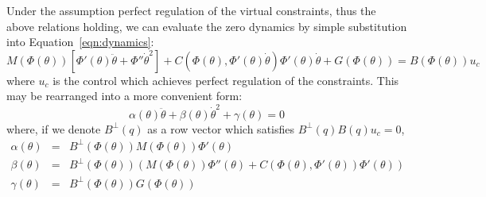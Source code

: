 Under the assumption perfect regulation of the virtual constraints, thus the above relations holding, we can evaluate the zero dynamics by simple substitution into Equation~\ref{eqn:dynamics}:
\begin{equation}
	M\left(\Phi(\theta)\right)\left[\Phi'(\theta)\ddot{\theta} + \Phi''\dot{\theta}^2\right] + 
	C\left(\Phi(\theta),\Phi'(\theta)\dot{\theta}\right)\Phi'(\theta)\dot{\theta} +
	G\left(\Phi(\theta)\right) = B\left(\Phi(\theta)\right)u_c
\end{equation}
where $u_c$ is the control which achieves perfect regulation of the constraints. This may be rearranged into a more convenient form:
\begin{equation} \label{eqn:zerodyn}
	\alpha(\theta)\ddot{\theta} + \beta(\theta)\dot{\theta}^2 + \gamma(\theta) = 0
\end{equation}
where, if we denote $B^{\perp}(q)$ as a row vector which satisfies $B^{\perp}(q)B(q)u_c = 0$,
\begin{eqnarray}
	\alpha(\theta) &=& B^{\bot}\left(\Phi(\theta)\right)M\left(\Phi(\theta)\right)\Phi'(\theta)\nonumber \\
	\beta(\theta) &=& B^{\bot}\left(\Phi(\theta)\right)\left(M\left(\Phi(\theta)\right)\Phi''(\theta)
		+C\left(\Phi(\theta),\Phi'(\theta)\right)\Phi'(\theta) \right) \nonumber \\
	\gamma(\theta) &=& B^{\bot}\left(\Phi(\theta)\right)G\left(\Phi(\theta)\right)
\end{eqnarray} ~\\
\pagebreak

